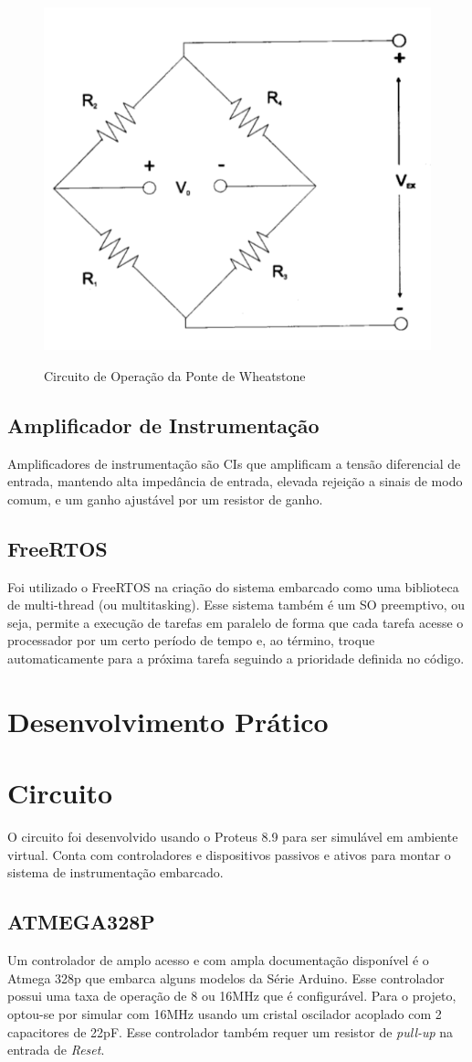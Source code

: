 \documentclass[a4paper, 12pt]{article}
\begin{document}
	\begin{figure}[!htb]
		\centering
		\caption{Circuito de Operação da Ponte de Wheatstone}
		\includegraphics[width=.4\linewidth]{circuitoponte}
		\label{fig:circuitoponte}
	\end{figure}
	
	\subsection{Amplificador de Instrumentação}
	Amplificadores de instrumentação são CIs que amplificam a tensão diferencial de entrada, mantendo alta impedância de entrada, elevada rejeição a sinais de modo comum, e um ganho ajustável por um resistor de ganho.
	
	\subsection{FreeRTOS}
	Foi utilizado o FreeRTOS na criação do sistema embarcado como uma biblioteca de multi-thread (ou multitasking). Esse sistema também é um SO preemptivo, ou seja, permite a execução de tarefas em paralelo de forma que cada tarefa acesse o processador por um certo período de tempo e, ao término, troque automaticamente para a próxima tarefa seguindo a prioridade definida no código. 
	
	\section{Desenvolvimento Prático}
	
\section{Circuito}
O circuito foi desenvolvido usando o Proteus 8.9 para ser simulável em ambiente virtual. Conta com controladores e dispositivos passivos e ativos para montar o sistema de instrumentação embarcado.  

\subsection{ATMEGA328P}
Um controlador de amplo acesso e com ampla documentação disponível é o Atmega 328p que embarca alguns modelos da Série Arduino. Esse controlador possui uma taxa de operação de 8 ou 16MHz que é configurável. Para o projeto, optou-se por simular com 16MHz usando um cristal oscilador acoplado com 2 capacitores de 22pF. Esse controlador também requer um resistor  de \textit{pull-up} na entrada de \textit{Reset}.
\end{document}
